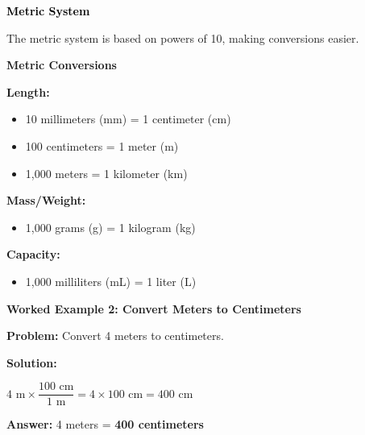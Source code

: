 \documentclass[12pt, letterpaper, fleqn]{article}
\begin{document}
\newpage

\begin{tcolorbox}[colback=customteal!20]
\large\textcolor{black}{\textbf{Metric System}}
\end{tcolorbox}

\noindent
The metric system is based on powers of 10, making conversions easier.

\vspace{3mm}

\begin{tcolorbox}[colback=white, colframe=black!25, boxrule=0.6pt, arc=4mm, left=6mm, right=6mm, top=5mm, bottom=5mm]

\textbf{Metric Conversions}

\medskip

\noindent
\textbf{Length:}
\begin{itemize}
    \item 10 millimeters (mm) = 1 centimeter (cm)
    \item 100 centimeters = 1 meter (m)
    \item 1,000 meters = 1 kilometer (km)
\end{itemize}

\noindent
\textbf{Mass/Weight:}
\begin{itemize}
    \item 1,000 grams (g) = 1 kilogram (kg)
\end{itemize}

\noindent
\textbf{Capacity:}
\begin{itemize}
    \item 1,000 milliliters (mL) = 1 liter (L)
\end{itemize}

\end{tcolorbox}

\vspace{4mm}

\begin{tcolorbox}[colback=white, colframe=black!25, boxrule=0.6pt, arc=4mm, left=6mm, right=6mm, top=5mm, bottom=5mm]

\textbf{Worked Example 2: Convert Meters to Centimeters}

\medskip

\textbf{Problem:} Convert 4 meters to centimeters.

\medskip

\noindent
\textbf{Solution:}

\medskip

\noindent
$4 \text{ m} \times \dfrac{100 \text{ cm}}{1 \text{ m}} = 4 \times 100 \text{ cm} = 400 \text{ cm}$

\medskip

\noindent
\textbf{Answer:} 4 meters = \textbf{400 centimeters}

\end{tcolorbox}
\end{document}
